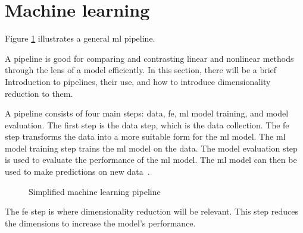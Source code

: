 \section{Machine learning}\label{sec:machine-learning}

Figure \ref{fig:basic-machine-learning-pipeline} illustrates a general \gls{ml} pipeline.

A pipeline is good for comparing and contrasting linear and nonlinear methods through the lens of a model efficiently. In this section, there will be a brief Introduction to pipelines, their use, and how to introduce dimensionality reduction to them.

A pipeline consists of four main steps: data, \gls{fe}, \gls{ml} model training, and model evaluation. The first step is the data step, which is the data collection. The \gls{fe} step transforms the data into a more suitable form for the \gls{ml} model. The \gls{ml} model training step trains the \gls{ml} model on the data. The model evaluation step is used to evaluate the performance of the \gls{ml} model. The \gls{ml} model can then be used to make predictions on new data~\cite{machine-learning-pipeline-architecture}.

\begin{figure}[htb!]
    \centering
    
    \caption{Simplified machine learning pipeline}
    \label{fig:basic-machine-learning-pipeline}
\end{figure}

The \gls{fe} step is where dimensionality reduction will be relevant. This step reduces the dimensions to increase the model's performance. 

